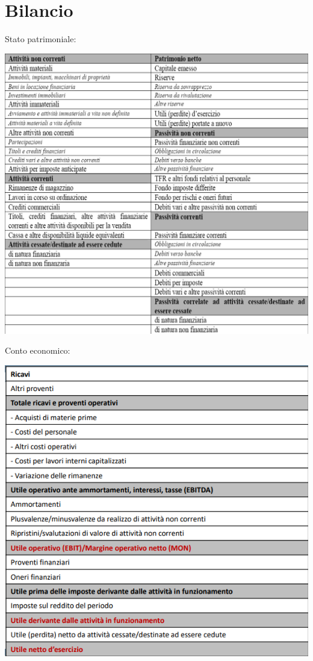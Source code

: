 \documentclass{scrreprt}
\begin{document}
\section*{Bilancio}
Stato patrimoniale:

\includegraphics[scale = 0.3]{stato_pat.png}

Conto economico:

\includegraphics[scale = 0.5]{conto_eco.png}
\end{document}
